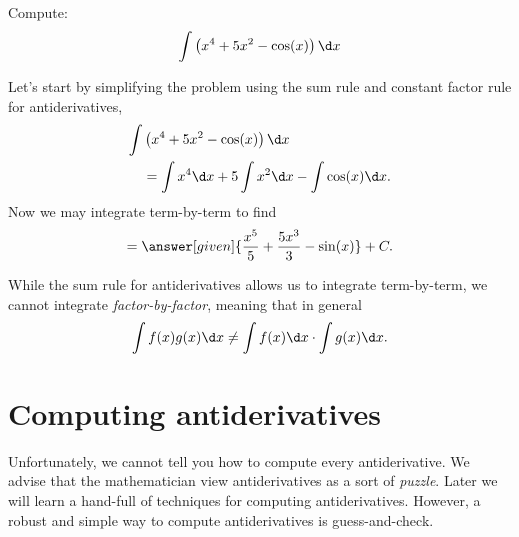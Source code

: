 \documentclass{ximera}
\begin{document}
\begin{example}
Compute:
\[
\int \left(x^4 + 5x^2 - \cos(x)\right) \d x
\]
\begin{explanation}
Let's start by simplifying the problem using the sum rule 
 and constant factor rule for antiderivatives, 
\begin{align*}
\int &\left(x^4 + 5x^2 - \cos(x)\right) \d x\\
&= \int x^4 \d x + 5\int x^2 \d x - \int \cos(x) \d x.
\end{align*}
Now we may integrate term-by-term to find
\[
= \answer[given]{\frac{x^5}{5} + \frac{5x^3}{3}  - \sin(x)}+C.
\]
\end{explanation}
\end{example}


\begin{warning}
While the sum rule for antiderivatives allows us to integrate
term-by-term, we cannot integrate \textit{factor-by-factor}, meaning
that in general
\[
\int f(x)g(x) \d x \ne \int f(x) \d x\cdot \int g(x) \d x.
\]
\end{warning}








\section{Computing antiderivatives}


Unfortunately, we cannot tell you how to compute every antiderivative.
We advise that the mathematician view antiderivatives as a sort of
\textit{puzzle}. Later we will learn a hand-full of techniques for
computing antiderivatives. However, a robust and simple way to compute
antiderivatives is guess-and-check.


\end{document}
